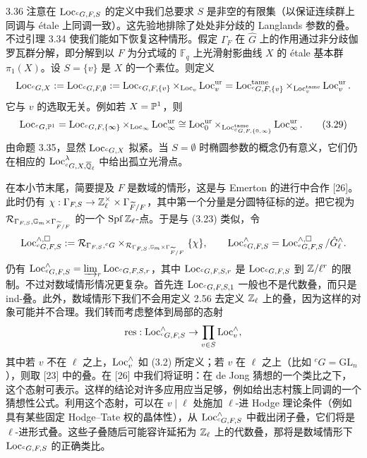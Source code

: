 \begin{rem}{3.36}
注意在 $\operatorname{Loc}_{{}^{c}G,F,S}$ 的定义中我们总要求 $S$ 是非空的有限集（以保证连续群上同调与 étale 上同调一致）。这先验地排除了处处非分歧的 Langlands 参数的叠。不过引理 3.34 使我们能如下恢复这种情形。假定 $\Gamma_F$ 在 $\hat G$ 上的作用通过非分歧伽罗瓦群分解，即分解到以 $F$ 为分式域的 $\mathbb F_q$ 上光滑射影曲线 $X$ 的 étale 基本群 $\pi_1(X)$。设 $S=\{v\}$ 是 $X$ 的一个素位。则定义
\[
\operatorname{Loc}_{{}^{c}G,X}:=\operatorname{Loc}_{{}^{c}G,F,\emptyset}:=\operatorname{Loc}_{{}^{c}G,F,\{v\}}\times_{\operatorname{Loc}_v}\operatorname{Loc}^{\mathrm{ur}}_v=\operatorname{Loc}^{\mathrm{tame}}_{{}^{c}G,F,\{v\}}\times_{\operatorname{Loc}^{\mathrm{tame}}_v}\operatorname{Loc}^{\mathrm{ur}}_v.
\]
它与 $v$ 的选取无关。例如若 $X=\mathbb{P}^1$，则
\begin{equation}
\operatorname{Loc}_{{}^{c}G,\mathbb{P}^1}=\operatorname{Loc}_{{}^{c}G,F,\{\infty\}}\times_{\operatorname{Loc}_{\infty}}\operatorname{Loc}^{\mathrm{ur}}_{\infty}\cong\operatorname{Loc}^{\mathrm{ur}}_{0}\times_{\operatorname{Loc}^{\mathrm{tame}}_{{}^{c}G,F,\{0,\infty\}}}\operatorname{Loc}^{\mathrm{ur}}_{\infty}. \tag{3.29}
\end{equation}
由命题 3.35，显然 $\operatorname{Loc}_{{}^{c}G,X}$ 拟紧。当 $S=\emptyset$ 时椭圆参数的概念仍有意义，它们仍在相应的 $\operatorname{Loc}^{\lambda}_{{}^{c}G,X,\overline{\mathbb{Q}}_{\ell}}$ 中给出孤立光滑点。

在本小节末尾，简要提及 $F$ 是数域的情形，这是与 Emerton 的进行中合作 [26]。此时仍有 $\chi:\Gamma_{F,S}\to\mathbb{Z}_{\ell}^{\times}\times\Gamma_{\widetilde F/F}$，其中第一个分量是分圆特征标的逆。把它视为 $\mathcal R_{\Gamma_{F,S},\mathbb G_m\times\Gamma_{\widetilde F/F}}$ 的一个 $\operatorname{Spf}\mathbb{Z}_{\ell}$-点。于是与 (3.23) 类似，令
\[
\operatorname{Loc}^{\wedge,\square}_{{}^{c}G,F,S}:=\mathcal R_{\Gamma_{F,S},{}^{c}G}\times_{\mathcal R_{\Gamma_{F,S},\mathbb G_m\times\Gamma_{\widetilde F/F}}}\{\chi\},\qquad
\operatorname{Loc}^{\wedge}_{{}^{c}G,F,S}=\operatorname{Loc}^{\wedge,\square}_{{}^{c}G,F,S}/\hat G^{\wedge}_{\ell}.
\]
仍有 $\operatorname{Loc}^{\wedge}_{{}^{c}G,F,S}=\varinjlim_{r}\operatorname{Loc}_{{}^{c}G,F,S,r}$，其中 $\operatorname{Loc}_{{}^{c}G,F,S,r}$ 是 $\operatorname{Loc}_{{}^{c}G,F,S}$ 到 $\mathbb{Z}/\ell^{r}$ 的限制。不过对数域情形情况更复杂。首先连 $\operatorname{Loc}_{{}^{c}G,F,S,1}$ 一般也不是代数叠，而只是 ind-叠。此外，数域情形下我们不会用定义 2.56 去定义 $\mathbb{Z}_{\ell}$ 上的叠，因为这样的对象可能并不合理。我们转而考虑整体到局部的态射
\[
\mathrm{res}:\operatorname{Loc}^{\wedge}_{{}^{c}G,F,S}\to\prod_{v\in S}\operatorname{Loc}^{\wedge}_v,
\]
其中若 $v$ 不在 $\ell$ 之上，$\operatorname{Loc}^{\wedge}_v$ 如 (3.2) 所定义；若 $v$ 在 $\ell$ 之上（比如 ${}^cG=\mathrm{GL}_n$），则取 [23] 中的叠。在 [26] 中我们将证明：在 de Jong 猜想的一个类比之下，这个态射可表示。这样的结论对许多应用应当足够，例如给出志村簇上同调的一个猜想性公式。利用这个态射，可以在 $v\mid\ell$ 处施加 $\ell$-进 Hodge 理论条件（例如具有某些固定 Hodge–Tate 权的晶体性），从 $\operatorname{Loc}^{\wedge}_{{}^{c}G,F,S}$ 中截出闭子叠，它们将是 $\ell$-进形式叠。这些子叠随后可能容许延拓为 $\mathbb{Z}_{\ell}$ 上的代数叠，那将是数域情形下 $\operatorname{Loc}_{{}^{c}G,F,S}$ 的正确类比。
\end{rem}

